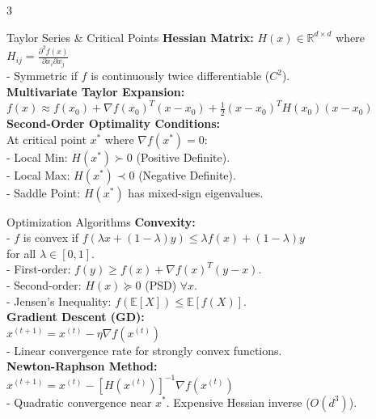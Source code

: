 \documentclass[10pt]{article}
\begin{document}
\begin{multicols*}{3}
\columnbreak

\begin{calcBox}{Taylor Series \& Critical Points}
\textbf{Hessian Matrix:} $H(x) \in \mathbb{R}^{d \times d}$ where $H_{ij} = \frac{\partial^2 f(x)}{\partial x_i \partial x_j}$ \\
- Symmetric if $f$ is continuously twice differentiable ($C^2$). \\
\textbf{Multivariate Taylor Expansion:} \\
$f(x) \approx f(x_0) + \nabla f(x_0)^T (x - x_0) + \frac{1}{2} (x - x_0)^T H(x_0) (x - x_0)$ \\
\textbf{Second-Order Optimality Conditions:} \\
At critical point $x^*$ where $\nabla f(x^*) = 0$: \\
- Local Min: $H(x^*) \succ 0$ (Positive Definite). \\
- Local Max: $H(x^*) \prec 0$ (Negative Definite). \\
- Saddle Point: $H(x^*)$ has mixed-sign eigenvalues.
\end{calcBox}

\begin{calcBox}{Optimization Algorithms}
\textbf{Convexity:} \\
- $f$ is convex if $f(\lambda x + (1-\lambda)y) \le \lambda f(x) + (1-\lambda)y$ \\
  for all $\lambda \in [0, 1]$. \\
- First-order: $f(y) \ge f(x) + \nabla f(x)^T(y-x)$. \\
- Second-order: $H(x) \succeq 0$ (PSD) $\forall x$. \\
- Jensen's Inequality: $f(\mathbb{E}[X]) \le \mathbb{E}[f(X)]$. \\
\textbf{Gradient Descent (GD):} \\
$x^{(t+1)} = x^{(t)} - \eta \nabla f(x^{(t)})$ \\
- Linear convergence rate for strongly convex functions. \\
\textbf{Newton-Raphson Method:} \\
$x^{(t+1)} = x^{(t)} - [H(x^{(t)})]^{-1} \nabla f(x^{(t)})$ \\
- Quadratic convergence near $x^*$. Expensive Hessian inverse ($O(d^3)$).
\end{calcBox}


\end{multicols*}
\end{document}
